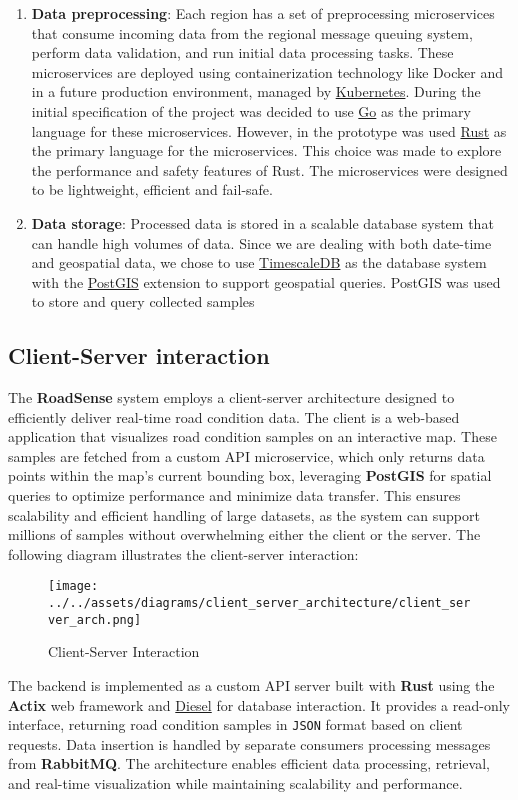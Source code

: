 \begin{enumerate}
	\item \textbf{Data preprocessing}: Each region has a set of preprocessing microservices that consume incoming data from the regional message queuing system, perform data validation, and run initial data processing tasks. These microservices are deployed using containerization technology like Docker and in a future production environment, managed by \href{https://kubernetes.io/}{Kubernetes}.
	      During the initial specification of the project was decided to use \href{https://golang.org/}{Go} as the primary language for these microservices. However, in the prototype was used \href{https://rust-lang.org/}{Rust} as the primary language for the microservices. This choice was made to explore the performance and safety features of Rust. The microservices were designed to be lightweight, efficient and fail-safe.

	\item \textbf{Data storage}: Processed data is stored in a scalable database system that can handle high volumes of data. Since we are dealing with both date-time and geospatial data, we chose to use \href{https://www.timescale.com/}{TimescaleDB} as the database system with the \href{https://postgis.net/}{PostGIS} extension to support geospatial queries.
	      PostGIS was used to store and query collected samples
\end{enumerate}

\subsection{Client-Server interaction}

The \textbf{RoadSense} system employs a client-server architecture designed to efficiently deliver real-time road condition data. The client is a web-based application that visualizes road condition samples on an interactive map. These samples are fetched from a custom API microservice, which only returns data points within the map's current bounding box, leveraging \textbf{PostGIS} for spatial queries to optimize performance and minimize data transfer. This ensures scalability and efficient handling of large datasets, as the system can support millions of samples without overwhelming either the client or the server. The following diagram illustrates the client-server interaction:

\begin{figure}[H]
	\centering
	\texttt{[image: ../../assets/diagrams/client\_server\_architecture/client\_server\_arch.png]}
	\caption{Client-Server Interaction}
\end{figure}

\noindent The backend is implemented as a custom API server built with \textbf{Rust} using the \textbf{Actix} web framework and \href{https://diesel.rs/}{Diesel} for database interaction. It provides a read-only interface, returning road condition samples in \texttt{JSON} format based on client requests. Data insertion is handled by separate consumers processing messages from \textbf{RabbitMQ}. The architecture enables efficient data processing, retrieval, and real-time visualization while maintaining scalability and performance.
